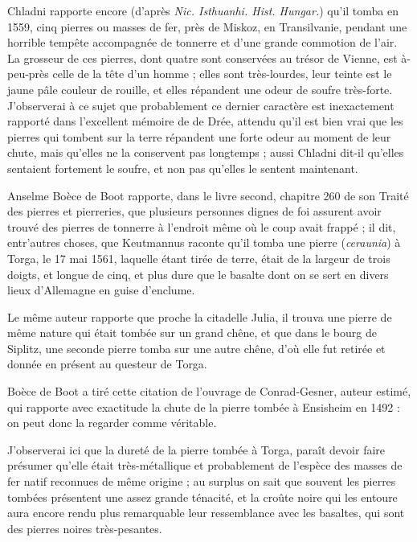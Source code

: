 \documentclass[a4paper, 12pt, oneside, french]{article}
\begin{document}
Chladni rapporte encore (d'après \emph{Nic. Isthuanhi. Hist. Hungar.}) qu'il tomba en 1559, cinq pierres ou masses de fer, près de Miskoz, en Transilvanie, pendant une horrible tempête accompagnée de tonnerre et d'une grande commotion de l'air. La grosseur de ces pierres, dont quatre sont conservées au trésor de Vienne, est à-peu-près celle de la tête d'un homme ; elles sont très-lourdes, leur teinte est le jaune pâle couleur de rouille, et elles répandent une odeur de soufre très-forte. J'observerai à ce sujet que probablement ce dernier caractère est inexactement rapporté dans l'excellent mémoire de de Drée, attendu qu'il est bien vrai que les pierres qui tombent sur la terre répandent une forte odeur au moment de leur chute, mais qu'elles ne la conservent pas longtemps ; aussi Chladni dit-il qu'elles sentaient fortement le soufre, et non pas qu'elles le sentent maintenant.

Anselme Boèce de Boot rapporte, dans le livre second, chapitre 260 de son Traité des pierres et pierreries, que plusieurs personnes dignes de foi assurent avoir trouvé des pierres de tonnerre à l'endroit même où le coup avait frappé ; il dit, entr'autres choses, que Keutmannus raconte qu'il tomba une pierre (\emph{ceraunia}) à Torga, le 17 mai 1561, laquelle étant tirée de terre, était de la largeur de trois doigts, et longue de cinq, et plus dure que le basalte dont on se sert en divers lieux d'Allemagne en guise d'enclume.

Le même auteur rapporte que proche la citadelle Julia, il trouva une pierre de même nature qui était tombée sur un grand chêne, et que dans le bourg de Siplitz, une seconde pierre tomba sur une autre chêne, d'où elle fut retirée et donnée en présent au questeur de Torga.

Boèce de Boot a tiré cette citation de l'ouvrage de Conrad-Gesner, auteur estimé, qui rapporte avec exactitude la chute de la pierre tombée à Ensisheim en 1492 : on peut donc la regarder comme véritable.

J'observerai ici que la dureté de la pierre tombée à Torga, paraît devoir faire présumer qu'elle était très-métallique et probablement de l'espèce des masses de fer natif reconnues de même origine ; au surplus on sait que souvent les pierres tombées présentent une assez grande ténacité, et la croûte noire qui les entoure aura encore rendu plus remarquable leur ressemblance avec les basaltes, qui sont des pierres noires très-pesantes.
\end{document}
